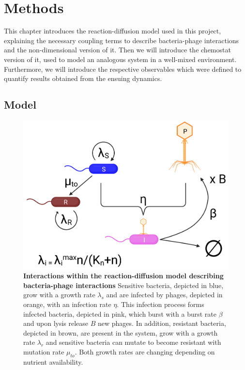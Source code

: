 \chapter{Methods}
\label{chap:phage_methods}

This chapter introduces the reaction-diffusion model used in this project, explaining the necessary coupling terms to describe bacteria-phage interactions and the non-dimensional version of it. Then we will introduce the chemostat version of it, used to model an analogous system in a well-mixed environment. Furthermore, we will introduce the respective observables which were defined to quantify results obtained from the ensuing dynamics.
\section{Model}
\begin{figure}
\centering
\includegraphics[width=\linewidth]{graphics/2025_09_30_phages_fig1.png}
\caption{\textbf{Interactions within the reaction-diffusion model describing bacteria-phage interactions} Sensitive bacteria, depicted in blue, grow with a growth rate $\lambda_s$ and are infected by phages, depicted in orange, with an infection rate $\eta$. This infection process forms infected bacteria, depicted in pink, which burst with a burst rate $\beta$ and upon lysis release $B$ new phages. In addition, resistant bacteria, depicted in brown, are present in the system, grow with a growth rate $\lambda_r$ and sensitive bacteria can mutate to become resistant with mutation rate $\mu_{to}$. Both growth rates are changing depending on nutrient availability.}
\label{fig:model_sketch}
\end{figure}
